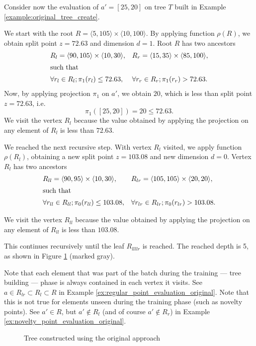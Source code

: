 \begin{example}
\label{ex:novelty_point_evaluation_original}
    Consider now the evaluation of $a' = [25,20]$ on tree $T$ built in Example \ref{example:original_tree_create}.

    We start with the root $R = \langle 5,105\rangle \times \langle 10, 100 \rangle$.
    By applying function $\rho(R)$, we obtain split point $z = 72.63$ and dimension $d = 1$.
    Root $R$ has two ancestors 
\begin{align*}
    &R_l = \langle 90,105\rangle \times \langle 10, 30 \rangle,&
    &R_r = \langle 15,35\rangle \times \langle 85, 100 \rangle,\\
    \intertext{such that}
    &\forall r_l\in R_l; \pi_1(r_l) \le 72.63,&
    &\forall r_r\in R_r; \pi_1(r_r) > 72.63.
\end{align*}
Now, by applying projection $\pi_1$ on $a'$, we obtain $20$, which is less than split point $z = 72.63$, i.e.
$$\pi_1([25,20]) = 20 \le 72.63.$$
We visit the vertex $R_l$ because the value obtained by applying the projection on any element of $R_l$ is less than $72.63$.

We reached the next recursive step. With vertex $R_l$ visited, we apply function $\rho(R_l)$, obtaining a new split point $z = 103.08$ and new dimension $d = 0$.
Vertex $R_l$ has two ancestors 
\begin{align*}
    &R_{ll} = \langle 90,95\rangle \times \langle 10, 30 \rangle,&
    &R_{lr} = \langle 105,105\rangle \times \langle 20,20 \rangle,\\
    \intertext{such that}
    &\forall r_{ll}\in R_{ll}; \pi_0(r_{ll}) \le 103.08,&
    &\forall r_{lr}\in R_{lr}; \pi_0(r_{lr}) > 103.08.
\end{align*}

We visit the vertex $R_{ll}$ because the value obtained by applying the projection on any element of $R_{ll}$ is less than $103.08$.

This continues recursively until the leaf $R_{llllr}$ is reached. The reached depth is 5, as shown in Figure \ref{fig:example_noutlier_tree_color} (marked gray).

\end{example}


Note that each element that was part of the batch during the training --- tree building --- phase is always contained in each vertex it visits.
See $a \in R_{lr} \subset R_{l} \subset R$ in Example \ref{ex:regular_point_evaluation_original}.
Note that this is not true for elements unseen during the training phase (such as novelty points).
See $a' \in R$, but $a' \notin R_l$ (and of course $a' \notin R_r$) in Example \ref{ex:novelty_point_evaluation_original}.

\begin{figure}[htbp]
\centering

\caption{Tree constructed using the original approach}
\label{fig:example_noutlier_tree_color}
\end{figure}
